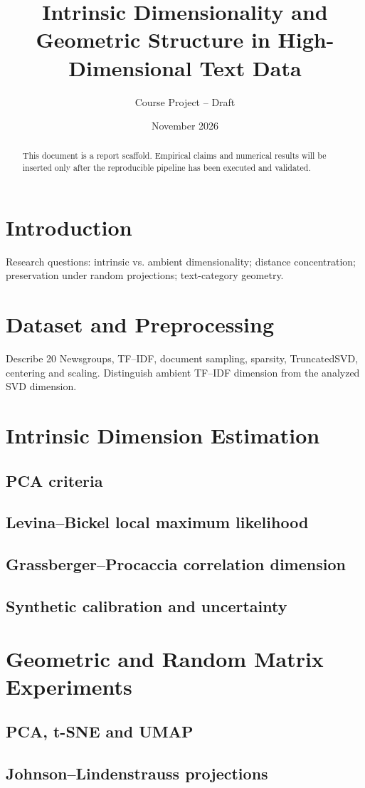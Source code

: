 \documentclass[11pt,a4paper]{article}
\title{Intrinsic Dimensionality and Geometric Structure in High-Dimensional Text Data}
\author{Course Project -- Draft}
\date{November 2026}
\begin{document}
\maketitle
\begin{abstract}
This document is a report scaffold. Empirical claims and numerical results will be inserted only after the reproducible pipeline has been executed and validated.
\end{abstract}
\tableofcontents
\section{Introduction}
Research questions: intrinsic vs. ambient dimensionality; distance concentration; preservation under random projections; text-category geometry.
\section{Dataset and Preprocessing}
Describe 20 Newsgroups, TF--IDF, document sampling, sparsity, TruncatedSVD, centering and scaling. Distinguish ambient TF--IDF dimension from the analyzed SVD dimension.
\section{Intrinsic Dimension Estimation}
\subsection{PCA criteria}
\subsection{Levina--Bickel local maximum likelihood}
\subsection{Grassberger--Procaccia correlation dimension}
\subsection{Synthetic calibration and uncertainty}
\section{Geometric and Random Matrix Experiments}
\subsection{PCA, t-SNE and UMAP}
\subsection{Johnson--Lindenstrauss projections}
\end{document}
